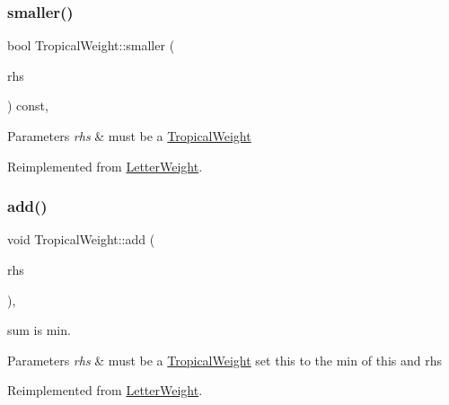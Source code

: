 \subsubsection{\texorpdfstring{smaller()}{smaller()}\hspace{0.1cm}{\footnotesize\ttfamily [3/4]}}
{\footnotesize\ttfamily bool Tropical\+Weight\+::smaller (\begin{DoxyParamCaption}\item[{const \mbox{\hyperlink{classLetterWeight}{Letter\+Weight}} $\ast$}]{rhs }\end{DoxyParamCaption}) const\hspace{0.3cm}{\ttfamily [protected]}, {\ttfamily [virtual]}}


\begin{DoxyParams}{Parameters}
{\em rhs} & must be a \mbox{\hyperlink{classTropicalWeight}{Tropical\+Weight}} \\
\hline
\end{DoxyParams}


Reimplemented from \mbox{\hyperlink{group__weight_ga0ef9dd9bcd765c0e3c50b384b34d88d2}{Letter\+Weight}}.

\mbox{\label{group__weight_ga41791f144fea9717092970563337d040}} 
\subsubsection{\texorpdfstring{add()}{add()}\hspace{0.1cm}{\footnotesize\ttfamily [3/5]}}
{\footnotesize\ttfamily void Tropical\+Weight\+::add (\begin{DoxyParamCaption}\item[{const \mbox{\hyperlink{classLetterWeight}{Letter\+Weight}} $\ast$}]{rhs }\end{DoxyParamCaption})\hspace{0.3cm}{\ttfamily [protected]}, {\ttfamily [virtual]}}



sum is min. 


\begin{DoxyParams}{Parameters}
{\em rhs} & must be a \mbox{\hyperlink{classTropicalWeight}{Tropical\+Weight}} set this to the min of this and rhs \\
\hline
\end{DoxyParams}


Reimplemented from \mbox{\hyperlink{group__weight_ga49b09c8f364a2ebf1d154f606d9aaea8}{Letter\+Weight}}.


